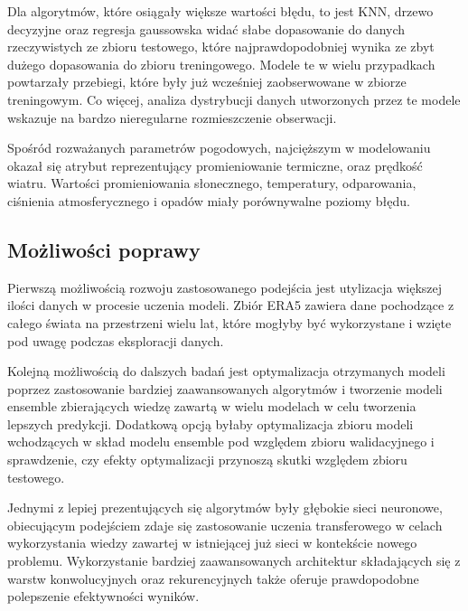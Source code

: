 Dla algorytmów, które osiągały większe wartości błędu, to jest KNN, drzewo decyzyjne
oraz regresja gaussowska widać słabe dopasowanie do danych rzeczywistych ze zbioru 
testowego, które najprawdopodobniej wynika ze zbyt dużego dopasowania do zbioru treningowego.
Modele te w wielu przypadkach powtarzały przebiegi, które były już wcześniej
zaobserwowane w zbiorze treningowym. Co więcej, analiza dystrybucji danych utworzonych
przez te modele wskazuje na bardzo nieregularne rozmieszczenie obserwacji.

Spośród rozważanych parametrów pogodowych, najcięższym w modelowaniu okazał
się atrybut reprezentujący promieniowanie termiczne, oraz prędkość wiatru.
Wartości promieniowania słonecznego, temperatury, odparowania, ciśnienia 
atmosferycznego i opadów miały porównywalne poziomy błędu.

\subsection{Możliwości poprawy}

Pierwszą możliwością rozwoju zastosowanego podejścia jest utylizacja większej ilości
danych w procesie uczenia modeli. Zbiór ERA5 zawiera dane pochodzące z całego świata
na przestrzeni wielu lat, które mogłyby być wykorzystane i wzięte pod uwagę podczas
eksploracji danych. 

Kolejną możliwością do dalszych badań jest optymalizacja otrzymanych modeli poprzez 
zastosowanie bardziej zaawansowanych algorytmów i tworzenie modeli ensemble
zbierających wiedzę zawartą w wielu modelach w celu tworzenia lepszych 
predykcji. Dodatkową opcją byłaby optymalizacja zbioru modeli wchodzących w skład
modelu ensemble pod względem zbioru walidacyjnego i sprawdzenie, czy efekty 
optymalizacji przynoszą skutki względem zbioru testowego.

Jednymi z lepiej prezentujących się algorytmów były głębokie sieci neuronowe,
obiecującym podejściem zdaje się zastosowanie uczenia transferowego w celach 
wykorzystania wiedzy zawartej w istniejącej już sieci w kontekście nowego problemu.
Wykorzystanie bardziej zaawansowanych architektur składających się z warstw konwolucyjnych
oraz rekurencyjnych także oferuje prawdopodobne polepszenie efektywności wyników.


